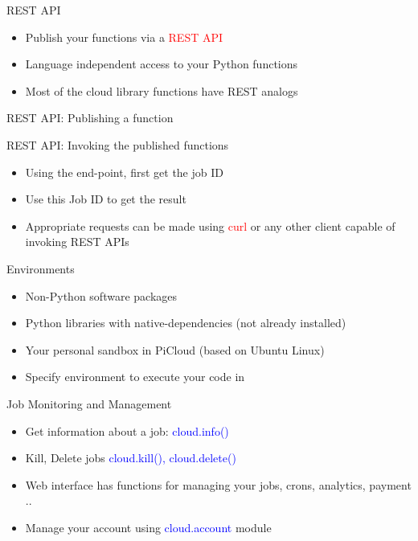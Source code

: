 \documentclass{beamer} \usepackage{fancyvrb} \usepackage{listings}
\begin{document}
    \begin{frame}{REST API}
      \begin{itemize}
      \item Publish your functions via a \textcolor{red}{REST API}
      \item Language independent access to your Python functions
      \item Most of the cloud library functions have REST analogs
      \end{itemize}
    \end{frame}

    \begin{frame}{REST API: Publishing a function}
      
      
    \end{frame}

    \begin{frame}{REST API: Invoking the published functions}
      \begin{itemize}
      \item Using the end-point, first get the job ID
      \item Use this Job ID to get the result
      \item Appropriate requests can be made using \textcolor{red}{curl} or any other
        client capable of invoking REST APIs
      \end{itemize}
    \end{frame}

    \begin{frame}{Environments}
      \begin{itemize}
      \item Non-Python software packages
      \item Python libraries with native-dependencies (not already
        installed)
      \item Your personal sandbox in PiCloud (based on Ubuntu Linux)
      \item Specify environment to execute your code in
      \end{itemize}
    \end{frame}


    \begin{frame}{Job Monitoring and Management}
      \begin{itemize}
      \item Get information about a job:
        \textcolor{blue}{cloud.info()}
      \item Kill, Delete jobs {\textcolor{blue}{cloud.kill(),
          cloud.delete()}}
      \item Web interface has functions for managing your jobs,
        crons, analytics, payment ..
      \item Manage your account using
        \textcolor{blue}{cloud.account} module
      \end{itemize}

    \end{frame}
\end{document}
